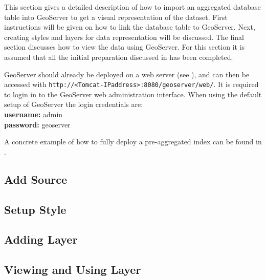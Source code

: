 This section gives a detailed description of how to import an
aggregated database table into GeoServer to get a visual representation of
the dataset. First instructions will be given on how to link the database
table to GeoServer. Next, creating styles and layers for data representation
will be discussed. The final section discusses how to view the data
using GeoServer.  For this section it is assumed that all the initial
preparation discussed in  has been completed.

GeoServer should already be deployed on a web server (see
), and can then be accessed with
\lstinline|http://<Tomcat-IPaddress>:8080/geoserver/web/|. It is required
to login in to the GeoServer web administration interface. When using the
default setup of GeoServer the login credentials are: \\
\indent \textbf{username:} admin \\
\indent \textbf{password:} geoserver

\noindent A concrete example of how to fully deploy a pre-aggregated index
can be found in .

\subsection{Add Source}
\label{sec:addingsource}

\pagebreak

\subsection{Setup Style}
\label{sec:addingstyle}


\subsection{Adding Layer}
\label{sec:addinglayers}


\subsection{Viewing and Using Layer}
\label{sec:previewlayer}

